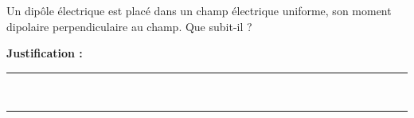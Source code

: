 Un dipôle électrique est placé dans un champ électrique uniforme, son moment dipolaire perpendiculaire au champ. Que subit-il ?

\choices

\noindent\textbf{Justification :} \hrulefill \\[2.5ex]
\rule{\linewidth}{0.4pt} \\[2.5ex]
\rule{\linewidth}{0.4pt}
\vfill
